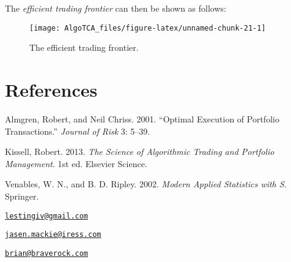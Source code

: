 The \emph{efficient trading frontier} can then be shown as follows:

\begin{Schunk}
\end{Schunk}

\begin{Schunk}
\begin{figure}[ht]

{\centering \texttt{[image: AlgoTCA\_files/figure-latex/unnamed-chunk-21-1]} 

}

\caption[The efficient trading frontier]{The efficient trading frontier.}\label{fig:unnamed-chunk-21}
\end{figure}
\end{Schunk}

\newpage

\hypertarget{references}{%
\section*{References}\label{references}}

\hypertarget{refs}{}
\leavevmode\hypertarget{ref-almgren2000}{}%
Almgren, Robert, and Neil Chriss. 2001. ``Optimal Execution of Portfolio
Transactions.'' \emph{Journal of Risk} 3: 5--39.

\leavevmode\hypertarget{ref-kissell2013}{}%
Kissell, Robert. 2013. \emph{The Science of Algorithmic Trading and
Portfolio Management}. 1st ed. Elsevier Science.

\leavevmode\hypertarget{ref-venables2002}{}%
Venables, W. N., and B. D. Ripley. 2002. \emph{Modern Applied Statistics
with S}. Springer.



\address{%
Vito Lestingi\\
MSc. Quantitative Finance Student - Sapienza University of Rome\\
\\
}
\href{mailto:lestingiv@gmail.com}{\nolinkurl{lestingiv@gmail.com}}

\address{%
Jasen K Mackie\\
Algorithmic Trading Services - Iress\\
\\
}
\href{mailto:jasen.mackie@iress.com}{\nolinkurl{jasen.mackie@iress.com}}

\address{%
Brian G Peterson\\
TODO\\
\\
}
\href{mailto:brian@braverock.com}{\nolinkurl{brian@braverock.com}}

